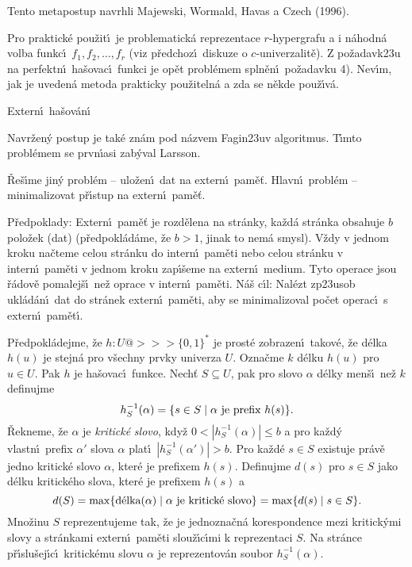 \flushpar Tento metapostup navrhli Majewski, Wormald, Havas a Czech (1996).
\medskip

\flushpar Pro praktick\'e pou\v zit\'\i\ je problematick\'a 
reprezentace $r$-hyper\-gra\-fu a i n\'ahodn\'a volba funkc\'\i\ 
$f_1,f_2,\dots,f_r$ (viz p\v redchoz\'\i\ diskuze o $c$-univerzalit\v e).  Z 
po\v zadavk\accent23u na perfektn\'\i\ ha\v sovac\'\i\ funkci je op\v et 
probl\'emem spln\v en\'\i\ po\v za\-davku 4).  Nev\'\i m, jak je uveden\'a 
metoda prakticky pou\-\v zi\-teln\'a a zda se n\v ekde pou\v z\'\i v\'a.  

\heading
Extern\'\i\ ha\v sov\'an\'\i
\endheading

\flushpar Navr\v zen\'y postup je tak\'e zn\'am pod n\'azvem Fagin\accent23uv algoritmus. T\'\i mto probl\'emem se prvn\'\i asi zab\'yval Larsson.
\medskip

\flushpar\v Re\v s\'\i me jin\'y probl\'em -- ulo\v zen\'\i\ dat na extern\'\i\ 
pam\v e\v t. Hlavn\'\i\ probl\'em -- minimalizovat p\v r\'\i stup na 
extern\'\i\ pam\v e\v t. 
\medskip

\flushpar P\v redpoklady:  Extern\'\i\ pam\v e\v t je rozd\v elena na 
str\'anky, ka\v zd\'a str\'anka obsahuje $b$ polo\v zek (dat) 
(p\v redpokl\'ad\'ame, \v ze $b>1$, jinak to nem\'a smysl).  V\v zdy v 
jednom kroku na\v cteme celou str\'anku do intern\'\i\ pam\v eti 
nebo celou str\'anku v intern\'\i\ pam\v eti v jednom kroku 
zap\'\i\v seme na extern\'\i\ medium.  Tyto operace jsou \v r\'adov\v e 
pomalej\v s\'\i\ ne\v z oprace v intern\'\i\ pam\v eti.  \newline 
N\'a\v s c\'\i l:  
Nal\'ezt zp\accent23usob ukl\'ad\'an\'\i\ dat do str\'anek extern\'\i\ 
pam\v eti, aby se minimalizoval po\v cet operac\'\i\ s extern\'\i\ 
pam\v et\'\i .  
\medskip

\flushpar P\v redpokl\'adejme, \v ze $h:U@>>>\{0,1\}^{*}$ je prost\'e 
zobrazen\'\i\ takov\'e, \v ze d\'elka $h(u)$ je stejn\'a pro v\v sechny prvky 
univerza $U$.  Ozna\v cme $k$ d\'elku $h(u)$ pro $u\in U$.  Pak $
h$ je 
ha\v sovac\'\i\ funkce.  Nech\v t $S\subseteq U$, pak pro slovo $
\alpha$ d\'elky 
men\v s\'\i\ ne\v z $k$ definujme 
$$h^{-1}_S(\alpha )=\{s\in S\mid\alpha\text{\rm\ je prefix }h(s)\}.$$ 
\v Rekneme, \v ze $\alpha$ je \emph{kritick\'e} \emph{slovo}, kdy\v z 
$0<|h^{-1}_S(\alpha )|\le b$ a pro ka\v zd\'y vlastn\'\i\ prefix $
\alpha'$ slova $\alpha$ plat\'\i\ 
$|h^{-1}_S(\alpha')|>b$.  Pro ka\v zd\'e $s\in S$ existuje pr\'av\v e jedno 
kritick\'e slovo $\alpha$, kter\'e je prefixem $h(s)$.  Definujme $
d(s)$ 
pro $s\in S$ jako d\'elku kritick\'eho slova, kter\'e je prefixem 
$h(s)$ a 
$$d(S)=\max\{\text{\rm d\'elka}(\alpha )\mid\alpha\text{\rm\ je kritick\'e slovo}\}=\max\{d(s)\mid s\in S\}.$$
Mno\v zinu $S$ reprezentujeme tak, \v ze je jednozna\v cn\'a 
korespondence mezi kritick\'ymi slovy a str\'ankami extern\'\i\ 
pam\v eti slou\v z\'\i\-c\'\i\-mi k reprezentaci $S$.  Na str\'ance 
p\v r\'\i slu\v sej\'\i c\'\i\ kritick\'emu slovu $\alpha$ je reprezentov\'an soubor 
$h^{-1}_S(\alpha )$.  

